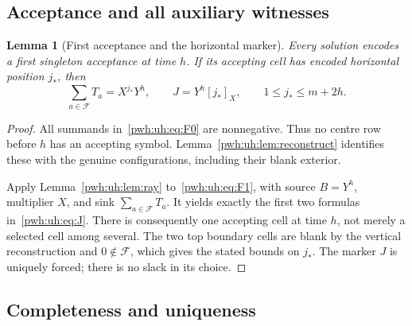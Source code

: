\documentclass[11pt,letterpaper]{article}
\numberwithin{equation}{section}
\newtheorem{lemma}[theorem]{Lemma}
\theoremstyle{definition}
\newcommand{\F}{\mathcal F}
\newcommand{\rep}[1]{[#1]_X}
\begin{document}
\subsection{Acceptance and all auxiliary witnesses}

\begin{lemma}[First acceptance and the horizontal marker]
\label{pwh:uh:lem:acceptance}
Every solution encodes a first singleton acceptance at time $h$. If its
accepting cell has encoded horizontal position $j_*$, then
\begin{equation}
 \sum_{a\in\F}T_a=X^{j_*}Y^h,
 \qquad J=Y^h\rep{j_*},
 \qquad 1\le j_*\le m+2h.
 \label{pwh:uh:eq:J}
\end{equation}
\end{lemma}

\begin{proof}
All summands in~\eqref{pwh:uh:eq:F0} are nonnegative. Thus no centre row before
$h$ has an accepting symbol. Lemma~\ref{pwh:uh:lem:reconstruct} identifies
these with the genuine configurations, including their blank exterior.

Apply Lemma~\ref{pwh:uh:lem:ray} to~\eqref{pwh:uh:eq:F1}, with source $B=Y^h$,
multiplier $X$, and sink $\sum_{a\in\F}T_a$. It yields exactly the first
two formulas in~\eqref{pwh:uh:eq:J}. There is consequently one accepting cell
at time $h$, not merely a selected cell among several. The two top
boundary cells are blank by the vertical reconstruction and $0\notin\F$,
which gives the stated bounds on $j_*$. The marker $J$ is uniquely forced;
there is no slack in its choice.
\end{proof}

\subsection{Completeness and uniqueness}
\end{document}
